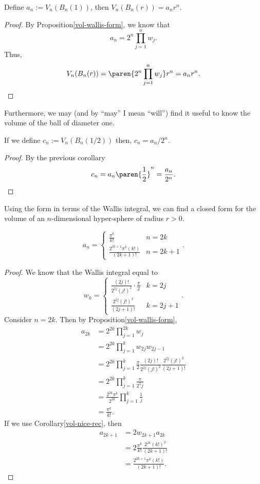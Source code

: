 \begin{corollary}
	Define $a_n:=V_n(B_n(1))$, then $V_n(B_n(r))=a_nr^n$.
\end{corollary}
\begin{proof}
	By Proposition\autoref{vol-wallis-form}, we know that
	\[
		a_n = 2^n \prod_{j=1}^n w_j.
	\]
	Thus,
	\[
		V_n(B_n(r)) = \paren{2^n \prod_{j=1}^n w_j} r^n =a_n r^n.
	\]
\end{proof}
Furthermore, we may (and by ``may'' I mean ``will'') find it useful to know the volume of the ball of diameter one.
\begin{corollary}
	If we define $c_n := V_n(B_n(1/2))$ then, $c_n = a_n/2^n$.
\end{corollary}
\begin{proof}
	By the previous corollary
	\[
		c_n = a_n \paren{\frac{1}{2}}^n=\frac{a_n}{2^n}.
	\]
\end{proof}
Using the form in terms of the Wallis integral, we can find a closed form for the volume of an $n$-dimensional hyper-sphere of radius $r>0$.
\begin{thm}
	\[
		a_n =
		\begin{cases}
			\frac{\pi^k}{k!} & n=2k\\
			\frac{2^{2k+1}\pi^k (k!)}{(2k+1)!} & n=2k+1
		\end{cases}.
	\]
\end{thm}
\begin{proof}
	We know that the Wallis integral equal to
	\[
		w_k =
		\begin{cases}
			\frac{(2j)!}{2^{2j}(j!)^2}\cdot \frac{\pi}{2} & k=2j\\
			\frac{2^{2j}(j!)^2}{(2j+1)!} & k=2j+1
		\end{cases}.
	\]
	Consider $n = 2k$.
	Then by Proposition\autoref{vol-wallis-form},
	\begin{align*}
		a_{2k}&=2^{2k} \prod_{j=1}^{2k} w_j\\
		&=2^{2k} \prod_{j=1}^{k} w_{2j}w_{2j-1}\\
		&=2^{2k} \prod_{j=1}^{k} \frac{\pi}{2}\frac{(2j)!}{2^{2j}(j!)^2}\frac{2^{2j}(j!)^2}{(2j+1)!}\\
		&=2^{2k} \prod_{j=1}^{k}\frac{\pi}{2^2 j}\\
		&=\frac{2^{2k} \pi^k}{2^{2k}}\prod_{j=1}^k\frac{1}{j}\\
		&=\frac{\pi^k}{k!}.
	\end{align*}
	If we use Corollary\autoref{vol-nice-rec}, then
	\begin{align*}
		a_{2k+1}&=2w_{2k+1}a_{2k}\\
		&=2\frac{\pi^k}{k!}\frac{2^{2k}(k!)^2}{(2k+1)!}\\
		&=\frac{2^{2k+1}\pi^k(k!)}{(2k+1)!}.
	\end{align*}
\end{proof}

